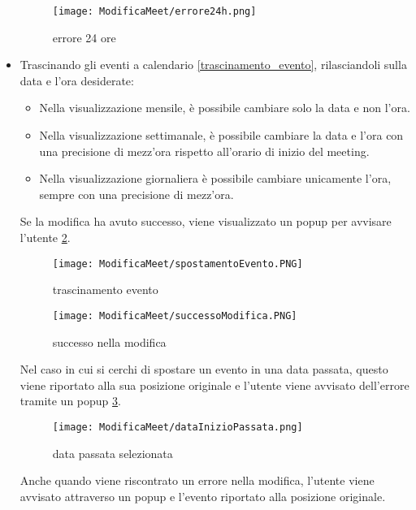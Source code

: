 \begin{itemize}
\begin{figure}[H]
\begin{minipage}{0.45\textwidth}
            \centering
            \texttt{[image: ModificaMeet/errore24h.png]}
            \caption{errore 24 ore}
            \label{errore_24_ore}
        \end{minipage}
    \end{figure}
    \item Trascinando gli eventi a calendario \ref{trascinamento_evento}, rilasciandoli sulla data e l'ora desiderate:
        \begin{itemize}
            \item Nella visualizzazione mensile, è possibile cambiare solo la data e non l'ora.
            \item Nella visualizzazione settimanale, è possibile cambiare la data e l'ora con una precisione di mezz'ora rispetto
            all'orario di inizio del meeting.
            \item Nella visualizzazione giornaliera è possibile cambiare unicamente l'ora, sempre con una precisione di mezz'ora.
        \end{itemize}
    Se la modifica ha avuto successo, viene visualizzato un popup per avvisare l'utente \ref{successo_nella_modifica}.
        \begin{figure}[H]
            \centering
            \begin{minipage}{0.45\textwidth}
                \centering
                \texttt{[image: ModificaMeet/spostamentoEvento.PNG]}
                \caption{trascinamento evento}
                \label{trascinamento_evento}
            \end{minipage}
            \hspace{0.05\textwidth}
            \begin{minipage}{0.45\textwidth}
                \centering
                \texttt{[image: ModificaMeet/successoModifica.PNG]}
                \caption{successo nella modifica}
                \label{successo_nella_modifica}
            \end{minipage}
        \end{figure}
        Nel caso in cui si cerchi di spostare un evento in una data passata, questo viene riportato alla sua posizione originale 
        e l'utente viene avvisato dell'errore tramite un popup \ref{data_passata_selezionata}.
    \begin{figure}[H]   
        \centering
        \texttt{[image: ModificaMeet/dataInizioPassata.png]}
        \caption{data passata selezionata}
        \label{data_passata_selezionata}
    \end{figure}
    Anche quando viene riscontrato un errore nella modifica, l'utente viene avvisato attraverso un popup e l'evento riportato
    alla posizione originale.
\end{itemize}
